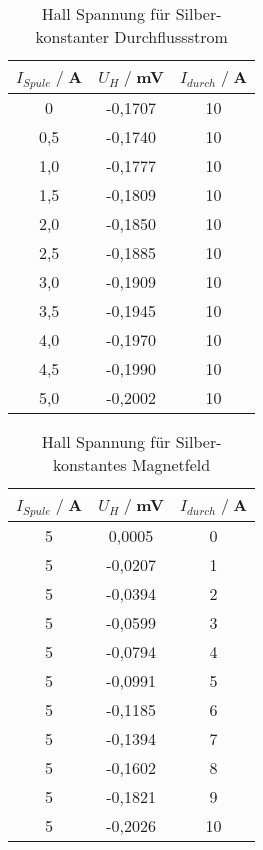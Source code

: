 \begin{table}
    \centering
    \begin{tabular}{c c c}
        \toprule
        $I_{Spule} \;/\;$A & $U_H\;/\;$mV & $I_{durch} \;/\;$A\\
        \midrule
            0                   &-0,1707&             10\\
            0,5                 &-0,1740&             10\\
            1,0                 &-0,1777&             10\\
            1,5                 &-0,1809&             10\\
            2,0                 &-0,1850&             10\\
            2,5                 &-0,1885&             10\\
            3,0                 &-0,1909&             10\\
            3,5                 &-0,1945&             10\\
            4,0                 &-0,1970&             10\\
            4,5                 &-0,1990&             10\\
            5,0                 &-0,2002&             10\\
       \bottomrule
    \end{tabular}
    \caption{Hall Spannung für Silber- konstanter Durchflussstrom}
    \label{tab:Ag_I}
\end{table}

\begin{table}
    \centering
    \begin{tabular}{c c c}
        \toprule
        $I_{Spule} \;/\;$A & $U_H\;/\;$mV & $I_{durch} \;/\;$A\\
        \midrule
  5                   &0,0005&              0\\
  5                   &-0,0207&             1\\
  5                   &-0,0394&             2\\
  5                   &-0,0599&             3\\
  5                   &-0,0794&             4\\
  5                   &-0,0991&             5\\
  5                   &-0,1185&             6\\
  5                   &-0,1394&             7\\
  5                   &-0,1602&             8\\
  5                   &-0,1821&             9\\
  5                   &-0,2026&             10\\

       \bottomrule
    \end{tabular}
    \caption{Hall Spannung für Silber- konstantes Magnetfeld}
    \label{tab:Ag_I}
\end{table}

